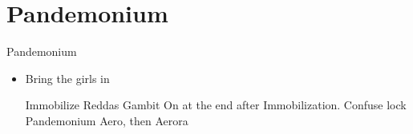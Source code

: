 \chapter{Pandemonium}

\begin{battle}{Pandemonium}
	\begin{itemize}
		\item Bring the girls in
		      \begin{gambit}
			      \begin{itemize}
			      \end{itemize}
		      \end{gambit}
		      \penelof Immobilize Reddas
		      \ashef Gambit On at the end after Immobilization.
		      \vaanf Confuse lock Pandemonium
		      \penelof Aero, then Aerora
	\end{itemize}
\end{battle}